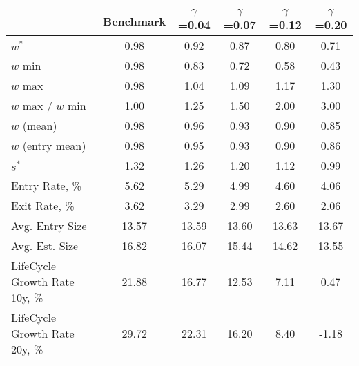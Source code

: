 \begin{tabular}{lccccc}
\toprule
{} & Benchmark & $\gamma$=0.04 & $\gamma$=0.07 & $\gamma$=0.12 & $\gamma$=0.20 \\
\midrule
$w^*$                         &      0.98 &          0.92 &          0.87 &          0.80 &          0.71 \\
$w$ min                       &      0.98 &          0.83 &          0.72 &          0.58 &          0.43 \\
$w$ max                       &      0.98 &          1.04 &          1.09 &          1.17 &          1.30 \\
$w$ max / $w$ min             &      1.00 &          1.25 &          1.50 &          2.00 &          3.00 \\
$w$ (mean)                    &      0.98 &          0.96 &          0.93 &          0.90 &          0.85 \\
$w$ (entry mean)              &      0.98 &          0.95 &          0.93 &          0.90 &          0.86 \\
$\bar{s}^*$                   &      1.32 &          1.26 &          1.20 &          1.12 &          0.99 \\
Entry Rate, \%                &      5.62 &          5.29 &          4.99 &          4.60 &          4.06 \\
Exit Rate, \%                 &      3.62 &          3.29 &          2.99 &          2.60 &          2.06 \\
Avg. Entry Size               &     13.57 &         13.59 &         13.60 &         13.63 &         13.67 \\
Avg. Est. Size                &     16.82 &         16.07 &         15.44 &         14.62 &         13.55 \\
LifeCycle Growth Rate 10y, \% &     21.88 &         16.77 &         12.53 &          7.11 &          0.47 \\
LifeCycle Growth Rate 20y, \% &     29.72 &         22.31 &         16.20 &          8.40 &         -1.18 \\
\bottomrule
\end{tabular}
